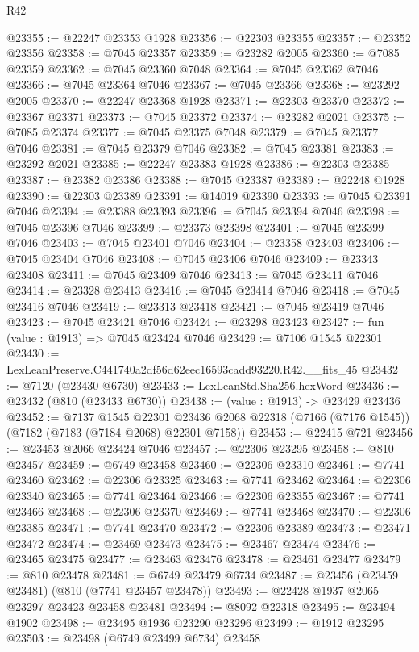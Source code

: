 \begin{lexlean}{R42}
\begin{coremodule}
{@23355 := @22247 @23353 @1928
@23356 := @22303 @23355
@23357 := @23352 @23356
@23358 := @7045 @23357
@23359 := @23282 @2005
@23360 := @7085 @23359
@23362 := @7045 @23360 @7048
@23364 := @7045 @23362 @7046
@23366 := @7045 @23364 @7046
@23367 := @7045 @23366
@23368 := @23292 @2005
@23370 := @22247 @23368 @1928
@23371 := @22303 @23370
@23372 := @23367 @23371
@23373 := @7045 @23372
@23374 := @23282 @2021
@23375 := @7085 @23374
@23377 := @7045 @23375 @7048
@23379 := @7045 @23377 @7046
@23381 := @7045 @23379 @7046
@23382 := @7045 @23381
@23383 := @23292 @2021
@23385 := @22247 @23383 @1928
@23386 := @22303 @23385
@23387 := @23382 @23386
@23388 := @7045 @23387
@23389 := @22248 @1928
@23390 := @22303 @23389
@23391 := @14019 @23390
@23393 := @7045 @23391 @7046
@23394 := @23388 @23393
@23396 := @7045 @23394 @7046
@23398 := @7045 @23396 @7046
@23399 := @23373 @23398
@23401 := @7045 @23399 @7046
@23403 := @7045 @23401 @7046
@23404 := @23358 @23403
@23406 := @7045 @23404 @7046
@23408 := @7045 @23406 @7046
@23409 := @23343 @23408
@23411 := @7045 @23409 @7046
@23413 := @7045 @23411 @7046
@23414 := @23328 @23413
@23416 := @7045 @23414 @7046
@23418 := @7045 @23416 @7046
@23419 := @23313 @23418
@23421 := @7045 @23419 @7046
@23423 := @7045 @23421 @7046
@23424 := @23298 @23423
@23427 := fun (value : @1913) => @7045 @23424 @7046
@23429 := @7106 @1545 @22301
@23430 := LexLeanPreserve.C441740a2df56d62eec16593cadd93220.R42.__fits_45
@23432 := @7120 (@23430 @6730)
@23433 := LexLeanStd.Sha256.hexWord
@23436 := @23432 (@810 (@23433 @6730))
@23438 := (value : @1913) -> @23429 @23436
@23452 := @7137
    @1545
    @22301
    @23436
    @2068
    @22318
    (@7166 (@7176 @1545))
    (@7182 (@7183 (@7184 @2068) @22301 @7158))
@23453 := @22415 @721
@23456 := @23453 @2066 @23424 @7046
@23457 := @22306 @23295
@23458 := @810 @23457
@23459 := @6749 @23458
@23460 := @22306 @23310
@23461 := @7741 @23460
@23462 := @22306 @23325
@23463 := @7741 @23462
@23464 := @22306 @23340
@23465 := @7741 @23464
@23466 := @22306 @23355
@23467 := @7741 @23466
@23468 := @22306 @23370
@23469 := @7741 @23468
@23470 := @22306 @23385
@23471 := @7741 @23470
@23472 := @22306 @23389
@23473 := @23471 @23472
@23474 := @23469 @23473
@23475 := @23467 @23474
@23476 := @23465 @23475
@23477 := @23463 @23476
@23478 := @23461 @23477
@23479 := @810 @23478
@23481 := @6749 @23479 @6734
@23487 := @23456 (@23459 @23481) (@810 (@7741 @23457 @23478))
@23493 := @22428 @1937 @2065 @23297 @23423 @23458 @23481
@23494 := @8092 @22318
@23495 := @23494 @1902
@23498 := @23495 @1936 @23290 @23296
@23499 := @1912 @23295
@23503 := @23498 (@6749 @23499 @6734) @23458
}
\end{coremodule}
\end{lexlean}
